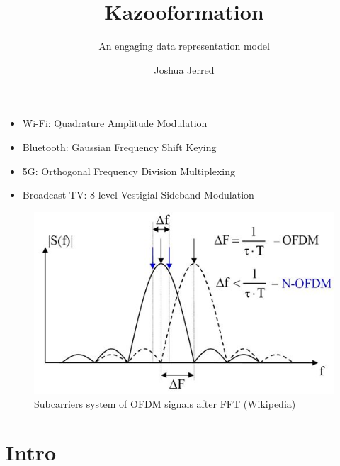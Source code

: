 \documentclass[
	11pt, %
]{beamer}
\title[Kazooformation]{Kazooformation} %
\subtitle{An engaging data representation model} %
\author[Joshua Jerred]{Joshua Jerred} %
\institute[UT]{Utah Tech} %
\date[\today]{} %
\begin{document}
\begin{frame}

  \begin{itemize}
    \item Wi-Fi: Quadrature Amplitude Modulation
    \item Bluetooth: Gaussian Frequency Shift Keying
    \item 5G: Orthogonal Frequency Division Multiplexing
    \item Broadcast TV: 8-level Vestigial Sideband Modulation
  \end{itemize}

  \begin{figure}
    \includegraphics[width=0.6\linewidth]{ofdm.png}
    \caption{Subcarriers system of OFDM signals after FFT (Wikipedia)}
  \end{figure}

\end{frame}


\begin{frame}
  \titlepage %
\end{frame}


\section{Intro} %
\end{document}
